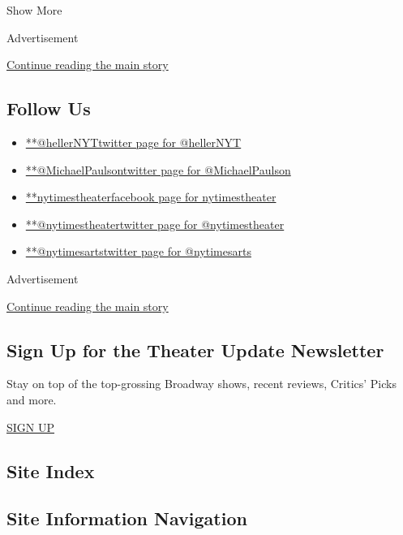 Show More

Advertisement

\protect\hyperlink{after-mid2}{Continue reading the main story}

\hypertarget{follow-us}{%
\subsection{Follow Us}\label{follow-us}}

\begin{itemize}
\tightlist
\item
  \href{https://twitter.com/hellerNYT}{**@hellerNYTtwitter page for
  @hellerNYT}
\item
  \href{https://twitter.com/MichaelPaulson}{**@MichaelPaulsontwitter
  page for @MichaelPaulson}
\item
  \href{https://www.facebook.com/nytimestheater}{**nytimestheaterfacebook
  page for nytimestheater}
\item
  \href{https://twitter.com/nytimestheater}{**@nytimestheatertwitter
  page for @nytimestheater}
\item
  \href{https://twitter.com/nytimesarts}{**@nytimesartstwitter page for
  @nytimesarts}
\end{itemize}

Advertisement

\protect\hyperlink{after-mktg}{Continue reading the main story}

\hypertarget{sign-up-for-the-theater-update-newsletter}{%
\subsection{Sign Up for the Theater Update
Newsletter}\label{sign-up-for-the-theater-update-newsletter}}

Stay on top of the top-grossing Broadway shows, recent reviews, Critics'
Picks and more.

\href{/newsletters/signup/CU}{SIGN UP}

\hypertarget{site-index}{%
\subsection{Site Index}\label{site-index}}

\hypertarget{site-information-navigation}{%
\subsection{Site Information
Navigation}\label{site-information-navigation}}

